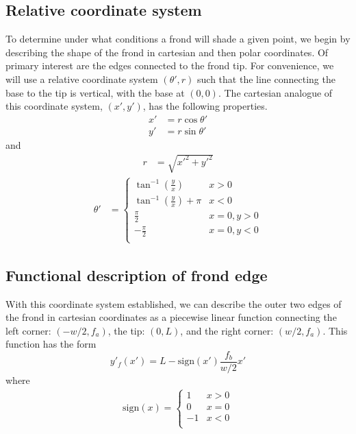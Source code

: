 \documentclass[10pt]{article}
\newcommand{\sign}{\mbox{sign}}
\begin{document}
\begin{multicols}{2}
\subsection{Relative coordinate system}
\label{sec:rel_coords}
To determine under what conditions a frond will shade a given point, we begin by describing the shape of the frond in cartesian and then polar coordinates.
Of primary interest are the edges connected to the frond tip.
For convenience, we will use a relative coordinate system $(\theta',r)$ such that the line connecting the base to the tip is vertical, with the base at $(0,0)$.
The cartesian analogue of this coordinate system, $(x',y')$, has the following properties.
\begin{align}
	x' &= r\cos\theta' \\ 
	y' &= r\sin\theta'
\end{align}
and
\begin{align}
	r &= \sqrt{x'^2+y'^2}
\end{align}
\vspace{-1em}
\begin{align}
	\theta' &= 
	\begin{cases}
		\tan^{-1}\left( \frac{y}{x} \right) & x > 0 \\
		\tan^{-1}\left( \frac{y}{x} \right) + \pi & x < 0 \\
		\frac{\pi}{2} & x = 0, y > 0 \\
		-\frac{\pi}{2} & x = 0, y < 0 \\
	\end{cases}
\end{align}

\subsection{Functional description of frond edge}
With this coordinate system established, we can describe the outer two edges of the frond in cartesian coordinates as a piecewise linear function connecting the left corner: $(-w/2,f_a)$, the tip: $(0,L)$, and the right corner: $(w/2,f_a)$.
This function has the form
\begin{equation}
	y'_f(x') = L-\sign(x')\frac{f_b}{w/2}x'
\end{equation}
where
\begin{align}
	\sign(x) = 
	\begin{cases}
		1 & x > 0 \\
		0 & x = 0 \\
		-1 & x < 0 \\
	\end{cases}
\end{align}


\end{multicols}
\end{document}
